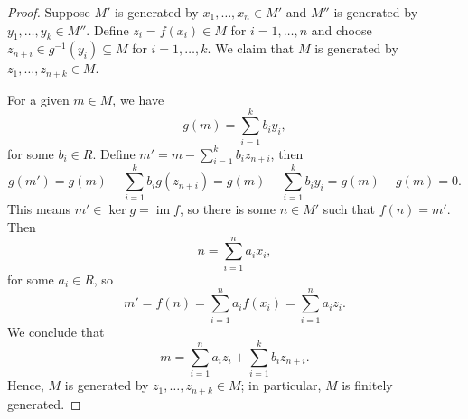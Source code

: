 \documentclass[12pt]{article}
\theoremstyle{definition}
\newcommand{\<}{\langle}
\renewcommand{\>}{\rangle}
\newcommand{\seq}{\subseteq}
\DeclareMathOperator{\im}{im}
\begin{document}
\begin{proof}
    Suppose $M'$ is generated by $x_1, \dots, x_n \in M'$ and $M''$ is generated by $y_1, \dots, y_k \in M''$.
    Define $z_i = f(x_i) \in M$ for $i = 1, \dots, n$ and choose $z_{n+i} \in g^{-1}(y_i) \seq M$ for $i = 1, \dots, k$.
    We claim that $M$ is generated by $z_1, \dots, z_{n+k} \in M$.

    For a given $m \in M$, we have
    \[
        g(m) = \sum_{i=1}^k b_i y_i,
    \]
    for some $b_i \in R$.
    Define $m' = m - \sum_{i=1}^k b_i z_{n+i}$, then
    \[
        g(m')
            = g(m) - \sum_{i=1}^k b_i g(z_{n+i})
            = g(m) - \sum_{i=1}^k b_i y_i
            = g(m) - g(m)
            = 0.
    \]
    This means $m' \in \ker g = \im f$, so there is some $n \in M'$ such that $f(n) = m'$.
    Then
    \[
        n = \sum_{i=1}^{n} a_i x_i,
    \]
    for some $a_i \in R$, so
    \[
        m' = f(n) = \sum_{i=1}^{n} a_i f(x_i) = \sum_{i=1}^{n} a_i z_i.
    \]
    We conclude that
    \[
        m = \sum_{i=1}^{n} a_i z_i + \sum_{i=1}^{k} b_i z_{n+i}.
    \]
    Hence, $M$ is generated by $z_1, \dots, z_{n+k} \in M$; in particular, $M$ is finitely generated.
\end{proof}
\end{document}
